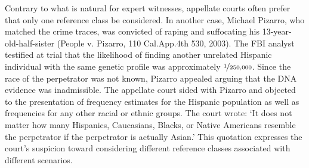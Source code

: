\documentclass{article}
\begin{document}
  Contrary to what is natural for expert witnesses, appellate courts often prefer that only one reference class be considered.  
    In another case, Michael Pizarro, who matched the crime traces, was convicted of raping and suffocating his 13-year-old-half-sister (People v. Pizarro, %
 110 Cal.App.4th 530, 2003). %
The FBI analyst testified at trial that the likelihood of finding another unrelated Hispanic individual with the same genetic profile was approximately $\nicefrac{1}{250,000}$. Since the race of the perpetrator was not known, Pizarro appealed arguing that the DNA evidence was inadmissible. 
The appellate court sided with Pizarro and objected to the presentation of frequency estimates for the Hispanic population as well as frequencies for any other racial or ethnic groups. 
The court wrote: `It does not matter how many Hispanics, Caucasians, Blacks, or Native Americans resemble the perpetrator if the perpetrator is actually Asian.' %
%
%
%
  This quotation expresses the court's suspicion toward considering different reference classes associated with different scenarios. 
\end{document}
